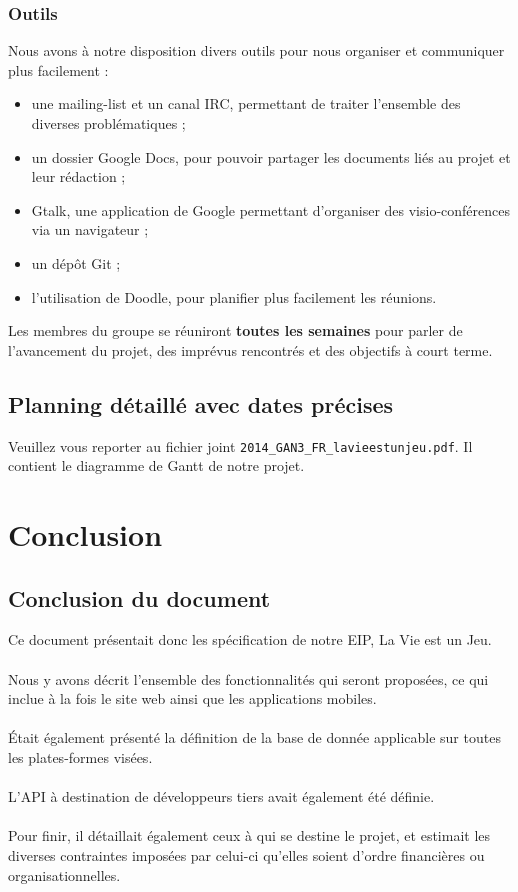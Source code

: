 \documentclass{life-fr}
\begin{document}
\subsection{ Outils}

Nous avons à notre disposition divers outils pour nous organiser et communiquer plus facilement :\\

\begin{itemize}
  \item une mailing-list et un canal IRC, permettant de traiter l'ensemble des diverses problématiques ;
  \item un dossier Google Docs, pour pouvoir partager les documents liés au projet et leur rédaction ;
  \item Gtalk, une application de Google permettant d'organiser des visio-conférences via un navigateur ;
  \item un dépôt Git ;
  \item l'utilisation de Doodle, pour planifier plus facilement les réunions.
\end{itemize}

Les membres du groupe se réuniront \textbf{toutes les semaines} pour parler de l'avancement du projet, des imprévus rencontrés et des objectifs à court terme.


\section{Planning détaillé avec dates précises}

Veuillez vous reporter au fichier joint \texttt{2014\_GAN3\_FR\_lavieestunjeu.pdf}. Il contient le diagramme de Gantt de notre projet.


\chapter{Conclusion}

\section{Conclusion du document}

Ce document présentait donc les spécification de notre EIP, La Vie est un Jeu.\\
\\
Nous y avons décrit l'ensemble des fonctionnalités qui seront proposées, ce qui inclue à la fois le site web ainsi que les applications mobiles.\\
\\
Était également présenté la définition de la base de donnée applicable sur toutes les plates-formes visées.\\
\\
L’API à destination de développeurs tiers avait également été définie.\\
\\
Pour finir, il détaillait également ceux à qui se destine le projet, et estimait les diverses contraintes imposées par celui-ci qu’elles soient d’ordre financières ou organisationnelles.\\
\end{document}
